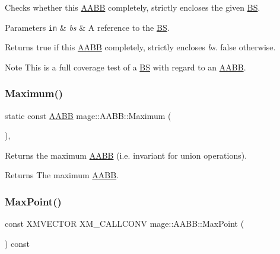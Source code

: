 Checks whether this \hyperlink{classmage_1_1_a_a_b_b}{A\+A\+BB} completely, strictly encloses the given \hyperlink{classmage_1_1_b_s}{BS}.


\begin{DoxyParams}[1]{Parameters}
\mbox{\tt in}  & {\em bs} & A reference to the \hyperlink{classmage_1_1_b_s}{BS}. \\
\hline
\end{DoxyParams}
\begin{DoxyReturn}{Returns}
{\ttfamily true} if this \hyperlink{classmage_1_1_a_a_b_b}{A\+A\+BB} completely, strictly encloses {\itshape bs}. {\ttfamily false} otherwise. 
\end{DoxyReturn}
\begin{DoxyNote}{Note}
This is a full coverage test of a \hyperlink{classmage_1_1_b_s}{BS} with regard to an \hyperlink{classmage_1_1_a_a_b_b}{A\+A\+BB}. 
\end{DoxyNote}
\hypertarget{classmage_1_1_a_a_b_b_a776d14b6995233ac53fa85e83854ef78}{}\label{classmage_1_1_a_a_b_b_a776d14b6995233ac53fa85e83854ef78} 
\subsubsection{\texorpdfstring{Maximum()}{Maximum()}}
{\footnotesize\ttfamily static const \hyperlink{classmage_1_1_a_a_b_b}{A\+A\+BB} mage\+::\+A\+A\+B\+B\+::\+Maximum (\begin{DoxyParamCaption}{ }\end{DoxyParamCaption})\hspace{0.3cm}{\ttfamily [static]}, {\ttfamily [noexcept]}}

Returns the maximum \hyperlink{classmage_1_1_a_a_b_b}{A\+A\+BB} (i.\+e. invariant for union operations).

\begin{DoxyReturn}{Returns}
The maximum \hyperlink{classmage_1_1_a_a_b_b}{A\+A\+BB}. 
\end{DoxyReturn}
\hypertarget{classmage_1_1_a_a_b_b_a98ec13950f8374c0bf6c4958f2203396}{}\label{classmage_1_1_a_a_b_b_a98ec13950f8374c0bf6c4958f2203396} 
\subsubsection{\texorpdfstring{Max\+Point()}{MaxPoint()}}
{\footnotesize\ttfamily const X\+M\+V\+E\+C\+T\+OR X\+M\+\_\+\+C\+A\+L\+L\+C\+O\+NV mage\+::\+A\+A\+B\+B\+::\+Max\+Point (\begin{DoxyParamCaption}{ }\end{DoxyParamCaption}) const\hspace{0.3cm}{\ttfamily [noexcept]}}


